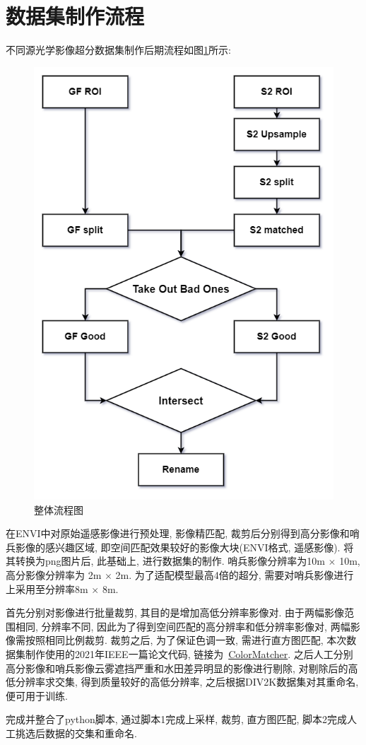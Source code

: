 \section{数据集制作流程}

不同源光学影像超分数据集制作后期流程如图\ref{fig:0101}所示:

\begin{figure}[htbp]
    \centering
    \includegraphics[height=0.7\textheight]{pic/chap01.png}
    \caption{整体流程图}
    \label{fig:0101}
\end{figure}

在ENVI中对原始遥感影像进行预处理, 影像精匹配, 裁剪后分别得到高分影像和哨兵影像的感兴趣区域, 即空间匹配效果较好的影像大块(ENVI格式, 遥感影像). 将其转换为png图片后, 此基础上, 进行数据集的制作. 哨兵影像分辨率为10m $\times$ 10m, 高分影像分辨率为 2m $\times$ 2m. 为了适配模型最高4倍的超分, 需要对哨兵影像进行上采用至分辨率8m $\times$ 8m. 

首先分别对影像进行批量裁剪, 其目的是增加高低分辨率影像对. 由于两幅影像范围相同, 分辨率不同, 因此为了得到空间匹配的高分辨率和低分辨率影像对, 两幅影像需按照相同比例裁剪. 裁剪之后, 为了保证色调一致, 需进行直方图匹配, 本次数据集制作使用的2021年IEEE一篇论文代码, 链接为~\href{https://github.com/hahnec/color-matcher}{ColorMatcher}. 之后人工分别高分影像和哨兵影像云雾遮挡严重和水田差异明显的影像进行剔除, 对剔除后的高低分辨率求交集, 得到质量较好的高低分辨率, 之后根据DIV2K数据集对其重命名, 便可用于训练.

完成并整合了python脚本, 通过脚本1完成上采样, 裁剪, 直方图匹配, 脚本2完成人工挑选后数据的交集和重命名. 